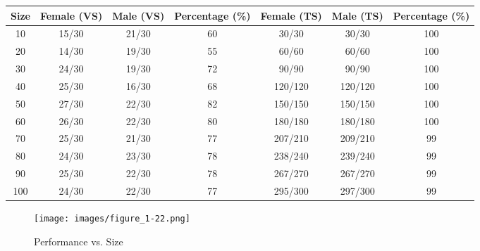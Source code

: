 \documentclass{article}
\begin{document}
\begin{center}
 \begin{tabular}{||c c c c c c c||} 
 \hline
  Size & Female (VS) &  Male (VS) & Percentage (\%)  & Female (TS)  & Male (TS) & Percentage (\%) \\ [0.5ex] 
 \hline\hline
 10 & 15/30 & 21/30 & 60 & 30/30 & 30/30 & 100 \\ 
 \hline
 20 & 14/30 & 19/30 & 55 & 60/60 & 60/60 & 100\\ 
 \hline
 30 & 24/30 & 19/30 & 72 & 90/90 & 90/90 & 100\\
 \hline
  40 & 25/30 & 16/30 & 68 & 120/120 & 120/120 & 100\\
 \hline
  50 & 27/30 & 22/30 & 82 & 150/150 & 150/150 & 100\\
 \hline
  60 & 26/30 & 22/30 & 80 & 180/180 & 180/180 & 100\\
 \hline
  70 & 25/30 & 21/30 & 77 & 207/210 & 209/210 & 99\\
 \hline
  80 & 24/30 & 23/30 & 78 & 238/240 & 239/240 & 99\\
 \hline
  90 & 25/30 & 22/30 & 78 & 267/270 & 267/270 & 99\\
 \hline 
 100 & 24/30 & 22/30 & 77 & 295/300 & 297/300 & 99\\
 \hline
\end{tabular}
\end{center}

\begin{figure*}[!ht]

  \texttt{[image: images/figure\_1-22.png]}
  \centering
  \caption{Performance vs. Size}
  \label{fig:sfig5a}

\end{figure*}
\clearpage
\end{document}
